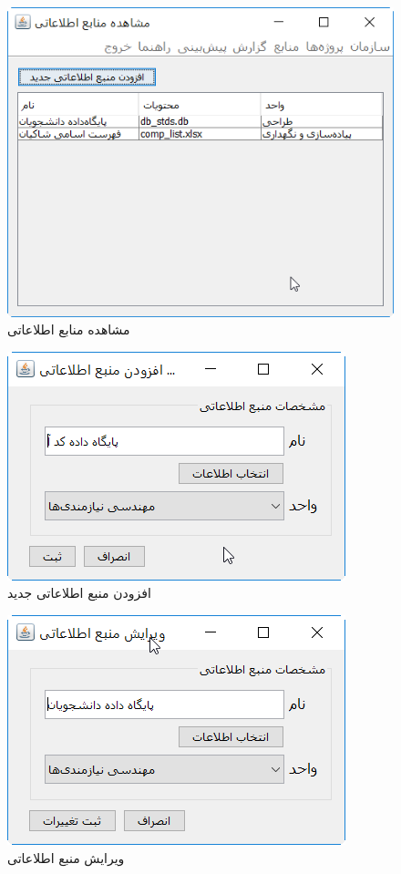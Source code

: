 \begin{figure}[H]
	\centering
	\includegraphics[scale=0.8]{img/prot/ViewInformationResources}
	\caption{مشاهده منابع اطلاعاتی}
\end{figure}
\begin{figure}[H]
	\centering
	\includegraphics[scale=0.8]{img/prot/AddNewInformationResource}
	\caption{افزودن منبع اطلاعاتی جدید}
\end{figure}
\begin{figure}[H]
	\centering
	\includegraphics[scale=0.8]{img/prot/EditInformationResource}
	\caption{ویرایش منبع اطلاعاتی }
\end{figure}
